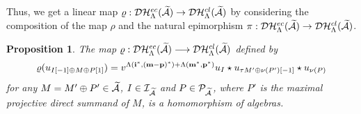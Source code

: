 \documentclass[reqno,12pt]{amsart}
\numberwithin{equation}{section}
\def\P{\mathcal{P}}\def\I{\mathcal{I}}\def\X{\mathbb X}\def\T{\mathbb T}\def\e{\mbox{\rm e}}
\theoremstyle{plain} %
\newtheorem{proposition}[theorem]{\bf Proposition}
\theoremstyle{definition} %
\begin{document}
Thus, we get a linear map $\varrho:\mathcal {D}\mathcal {H}_\Lambda^{ec}(\widetilde{\mathcal{A}})\rightarrow\mathcal {D}\mathcal {H}_\Lambda^{{cl}}(\widetilde{\mathcal{A}})$ by considering the composition of the map $\rho$ and the natural epimorphism $\pi: \mathcal {D}\mathcal {H}_\Lambda^{ec}(\widetilde{\mathcal{A}})\rightarrow\mathcal {D}\mathcal {H}_\Lambda^{{cl}}(\widetilde{\mathcal{A}})$.
\begin{proposition}
The map $\varrho:\mathcal {D}\mathcal {H}_\Lambda^{ec}(\widetilde{\mathcal{A}})\longrightarrow\mathcal {D}\mathcal {H}_\Lambda^{{cl}}(\widetilde{\mathcal{A}})$ defined by
$$\varrho(u_{I[-1]\oplus M\oplus P[1]})=v^{\Lambda({\bf i}^\ast,({\bf m}-{\bf p})^\ast)+\Lambda({\bf m}^\ast,{\bf p}^\ast)}u_I\star u_{\tau M'\oplus \nu(P')[-1]}\star u_{\nu(P)}$$ for any $M=M'\oplus P'\in\widetilde{\mathcal{A}}$, $I\in\I_{\widetilde{\A}}$ and $P\in\P_{\widetilde{\A}}$, where $P'$ is the maximal projective direct summand of $M$, is a homomorphism of algebras.
\end{proposition}
\end{document}
